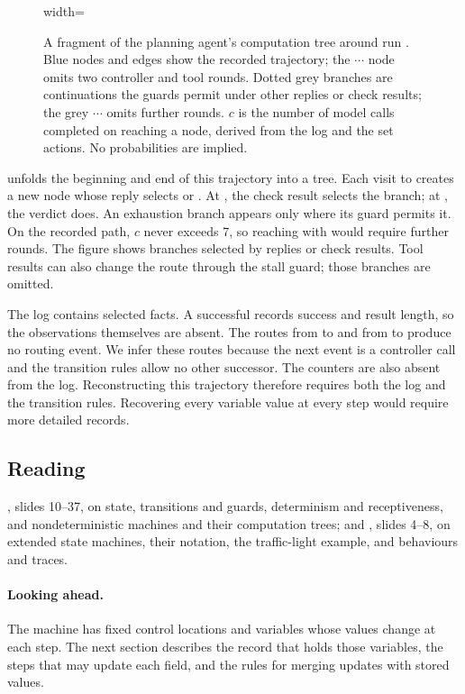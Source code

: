 \begin{figure}[tbp]
  \centering
  \begin{adjustbox}{width=\linewidth}\end{adjustbox}
  \caption{A fragment of the planning agent's computation tree around run . Blue nodes
  and edges show the recorded trajectory; the $\cdots$ node omits two controller and tool rounds.
  Dotted grey branches are continuations the guards permit under other replies or check results;
  the grey $\cdots$ omits further rounds. $c$ is the number of model calls completed on reaching a
  node, derived from the log and the set actions. No probabilities are implied.}
  \label{fig:efsm-trace-tree}
\end{figure}

 unfolds the beginning and end of this trajectory into a tree. Each visit
to  creates a new node whose reply selects  or .
At , the check result selects the branch; at , the verdict does.
An exhaustion branch appears only where its guard permits it. On the recorded path, $c$ never
exceeds 7, so reaching  with  would require further rounds.
The figure shows branches selected by replies or check results. Tool results can also change the
route through the stall guard; those branches are omitted.

The log contains selected facts. A successful  records success and result
length, so the observations themselves are absent. The routes from  to
 and from  to  produce no routing event. We
infer these routes because the next event is a controller call and the transition rules allow no
other successor. The counters are also absent from the log. Reconstructing this trajectory
therefore requires both the log and the transition rules. Recovering every variable value at
every step would require more detailed records.

\subsection{Reading}

\citet{seshia2015discrete}, slides 10--37, on state, transitions and guards,
determinism and receptiveness, and nondeterministic machines and their computation trees; and
\citet{seshia2015extended}, slides 4--8, on extended state machines, their notation, the
traffic-light example, and behaviours and traces.

\paragraph{Looking ahead.} The machine has fixed control locations and variables whose values
change at each step. The next section describes the record that holds those variables, the steps
that may update each field, and the rules for merging updates with stored values.
